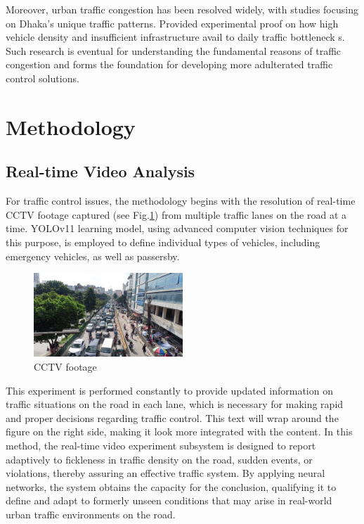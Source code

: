 \documentclass[conference]{IEEEtran}
\begin{document}
Moreover, urban traffic congestion has been resolved widely, with studies focusing on Dhaka's unique traffic patterns. Provided experimental proof on how high vehicle density and insufficient infrastructure avail to daily traffic bottleneck \cite{clar:a9}s. Such research is eventual for understanding the fundamental reasons of traffic congestion and forms the foundation for developing more adulterated traffic control solutions.

\section{Methodology}
\subsection{Real-time Video Analysis}
For traffic control issues, the methodology begins with the resolution of real-time CCTV footage captured (see Fig.\ref{fig:f1}) from multiple traffic lanes on the road at a time. YOLOv11 learning model, using advanced computer vision techniques for this purpose, is employed to define individual types of vehicles, including emergency vehicles, as well as passersby. 

\begin{figure}[H]
    \centering
    \includegraphics[width=0.5\textwidth]{7.jpg}
    \caption{CCTV footage} %
    \label{fig:f1} %
\end{figure}



This experiment is performed constantly to provide updated information on traffic situations on the road in each lane, which is necessary for making rapid and proper decisions regarding traffic control. This text will wrap around the figure on the right side, making it look more integrated with the content. In this method, the real-time video experiment subsystem is designed to report adaptively to fickleness in traffic density on the road, sudden events, or violations, thereby assuring an effective traffic system. By applying neural networks, the system obtains the capacity for the conclusion, qualifying it to define and adapt to formerly unseen conditions that may arise in real-world urban traffic environments on the road.
\end{document}
